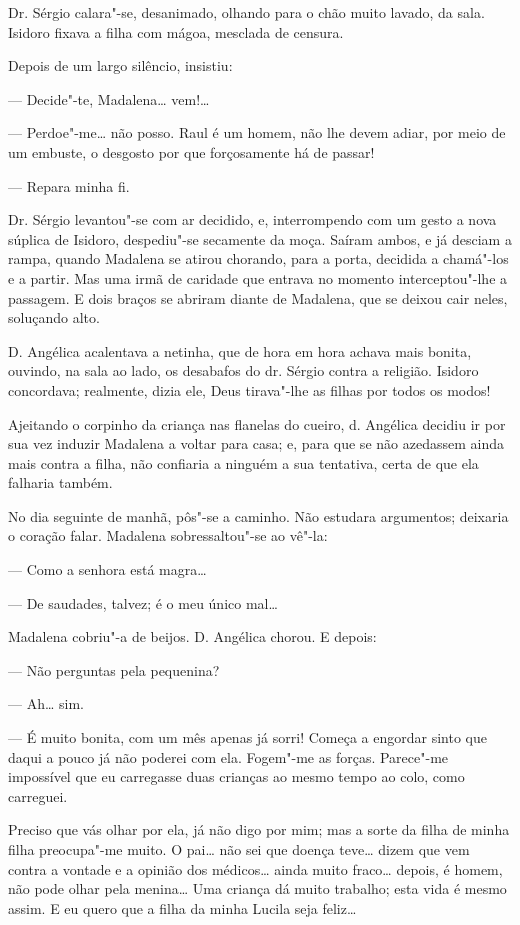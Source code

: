 Dr. Sérgio calara"-se, desanimado, olhando para o chão muito lavado, da
sala. Isidoro fixava a filha com mágoa, mesclada de censura.

Depois de um largo silêncio, insistiu:

--- Decide"-te, Madalena\ldots{} vem!\ldots{}

--- Perdoe"-me\ldots{} não posso. Raul é um homem, não lhe devem adiar, por
meio de um embuste, o desgosto por que forçosamente há de passar!

--- Repara minha fi.

Dr. Sérgio levantou"-se com ar decidido, e, interrompendo com um gesto a
nova súplica de Isidoro, despediu"-se secamente da moça. Saíram ambos, e
já desciam a rampa, quando Madalena se atirou chorando, para a porta,
decidida a chamá"-los e a partir. Mas uma irmã de caridade que entrava no
momento interceptou"-lhe a passagem. E dois braços se abriram diante de
Madalena, que se deixou cair neles, soluçando alto.

D. Angélica acalentava a netinha, que de hora em hora achava mais
bonita, ouvindo, na sala ao lado, os desabafos do dr. Sérgio contra a
religião. Isidoro concordava; realmente, dizia ele, Deus tirava"-lhe as
filhas por todos os modos!

Ajeitando o corpinho da criança nas flanelas do cueiro, d. Angélica
decidiu ir por sua vez induzir Madalena a voltar para casa; e, para que
se não azedassem ainda mais contra a filha, não confiaria a ninguém a
sua tentativa, certa de que ela falharia também.

No dia seguinte de manhã, pôs"-se a caminho. Não estudara argumentos;
deixaria o coração falar. Madalena sobressaltou"-se ao vê"-la:

--- Como a senhora está magra\ldots{}

--- De saudades, talvez; é o meu único mal\ldots{}

Madalena cobriu"-a de beijos. D. Angélica chorou. E depois:

--- Não perguntas pela pequenina?

--- Ah\ldots{} sim.

--- É muito bonita, com um mês apenas já sorri! Começa a engordar sinto
que daqui a pouco já não poderei com ela. Fogem"-me as forças. Parece"-me
impossível que eu carregasse duas crianças ao mesmo tempo ao colo, como
carreguei.

Preciso que vás olhar por ela, já não digo por mim; mas a sorte da filha
de minha filha preocupa"-me muito. O pai\ldots{} não sei que doença teve\ldots{}
dizem que vem contra a vontade e a opinião dos médicos\ldots{} ainda muito
fraco\ldots{} depois, é homem, não pode olhar pela menina\ldots{} Uma criança dá
muito trabalho; esta vida é mesmo assim. E eu quero que a filha da minha
Lucila seja feliz\ldots{}

